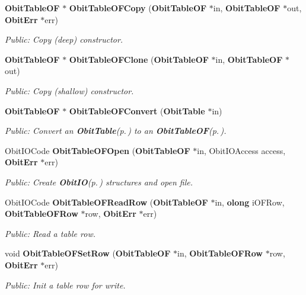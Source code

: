 \begin{CompactItemize}
{\bf Obit\-Table\-OF} $\ast$ {\bf Obit\-Table\-OFCopy} ({\bf Obit\-Table\-OF} $\ast$in, {\bf Obit\-Table\-OF} $\ast$out, {\bf Obit\-Err} $\ast$err)
\begin{CompactList}\small\item\em Public: Copy (deep) constructor. \item\end{CompactList}\item 
{\bf Obit\-Table\-OF} $\ast$ {\bf Obit\-Table\-OFClone} ({\bf Obit\-Table\-OF} $\ast$in, {\bf Obit\-Table\-OF} $\ast$out)
\begin{CompactList}\small\item\em Public: Copy (shallow) constructor. \item\end{CompactList}\item 
{\bf Obit\-Table\-OF} $\ast$ {\bf Obit\-Table\-OFConvert} ({\bf Obit\-Table} $\ast$in)
\begin{CompactList}\small\item\em Public: Convert an {\bf Obit\-Table}{\rm (p.\,\pageref{structObitTable})} to an {\bf Obit\-Table\-OF}{\rm (p.\,\pageref{structObitTableOF})}. \item\end{CompactList}\item 
Obit\-IOCode {\bf Obit\-Table\-OFOpen} ({\bf Obit\-Table\-OF} $\ast$in, Obit\-IOAccess access, {\bf Obit\-Err} $\ast$err)
\begin{CompactList}\small\item\em Public: Create {\bf Obit\-IO}{\rm (p.\,\pageref{structObitIO})} structures and open file. \item\end{CompactList}\item 
Obit\-IOCode {\bf Obit\-Table\-OFRead\-Row} ({\bf Obit\-Table\-OF} $\ast$in, {\bf olong} i\-OFRow, {\bf Obit\-Table\-OFRow} $\ast$row, {\bf Obit\-Err} $\ast$err)
\begin{CompactList}\small\item\em Public: Read a table row. \item\end{CompactList}\item 
void {\bf Obit\-Table\-OFSet\-Row} ({\bf Obit\-Table\-OF} $\ast$in, {\bf Obit\-Table\-OFRow} $\ast$row, {\bf Obit\-Err} $\ast$err)
\begin{CompactList}\small\item\em Public: Init a table row for write. \item\end{CompactList}\item 

\end{CompactItemize}
